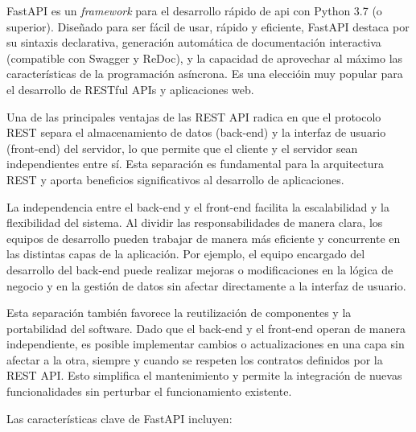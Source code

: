 FastAPI es un \textit{framework} para el desarrollo rápido de \acrshort{api} con Python 3.7 (o superior). Diseñado para ser fácil de usar, rápido y eficiente, FastAPI destaca por su sintaxis declarativa, generación automática de documentación interactiva (compatible con Swagger y ReDoc), y la capacidad de aprovechar al máximo las características de la programación asíncrona. Es una eleccióin muy popular para el desarrollo de RESTful APIs y aplicaciones web.

Una de las principales ventajas de las REST API radica en que el protocolo REST separa el almacenamiento de datos (back-end) y la interfaz de usuario (front-end) del servidor, lo que permite que el cliente y el servidor sean independientes entre sí. Esta separación es fundamental para la arquitectura REST y aporta beneficios significativos al desarrollo de aplicaciones.

La independencia entre el back-end y el front-end facilita la escalabilidad y la flexibilidad del sistema. Al dividir las responsabilidades de manera clara, los equipos de desarrollo pueden trabajar de manera más eficiente y concurrente en las distintas capas de la aplicación. Por ejemplo, el equipo encargado del desarrollo del back-end puede realizar mejoras o modificaciones en la lógica de negocio y en la gestión de datos sin afectar directamente a la interfaz de usuario.

Esta separación también favorece la reutilización de componentes y la portabilidad del software. Dado que el back-end y el front-end operan de manera independiente, es posible implementar cambios o actualizaciones en una capa sin afectar a la otra, siempre y cuando se respeten los contratos definidos por la REST API. Esto simplifica el mantenimiento y permite la integración de nuevas funcionalidades sin perturbar el funcionamiento existente.

Las características clave de FastAPI incluyen:

